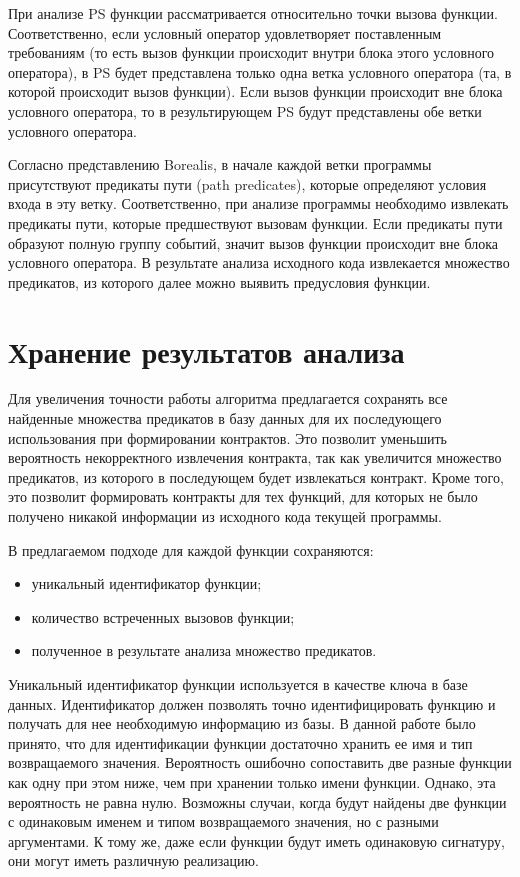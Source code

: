 При анализе PS функции рассматривается относительно точки вызова функции. Соответственно, если условный оператор удовлетворяет поставленным требованиям (то есть вызов функции происходит внутри блока этого условного оператора), в PS будет представлена только одна ветка условного оператора (та, в которой происходит вызов функции). Если вызов функции происходит вне блока условного оператора, то в результирующем PS будут представлены обе ветки условного оператора.

Согласно представлению Borealis, в начале каждой ветки программы присутствуют предикаты пути (path predicates), которые определяют условия входа в эту ветку. Соответственно, при анализе программы необходимо извлекать предикаты пути, которые предшествуют вызовам функции. Если предикаты пути образуют полную группу событий, значит вызов функции происходит вне блока условного оператора. В результате анализа исходного кода извлекается множество предикатов, из которого далее можно выявить предусловия функции.

\section{Хранение результатов анализа}
\label{section:saving}
Для увеличения точности работы алгоритма предлагается сохранять все найденные множества предикатов в базу данных для их последующего использования при формировании контрактов. Это позволит уменьшить вероятность некорректного извлечения контракта, так как увеличится множество предикатов, из которого в последующем будет извлекаться контракт. Кроме того, это позволит формировать контракты для тех функций, для которых не было получено никакой информации из исходного кода текущей программы.

В предлагаемом подходе для каждой функции сохраняются:
\begin{itemize}
\item уникальный идентификатор функции;
\item количество встреченных вызовов функции;
\item полученное в результате анализа множество предикатов.
\end{itemize}

Уникальный идентификатор функции используется в качестве ключа в базе данных. Идентификатор должен позволять точно идентифицировать функцию и получать для нее необходимую информацию из базы. В данной работе было принято, что для идентификации функции достаточно хранить ее имя и тип возвращаемого значения. Вероятность ошибочно сопоставить две разные функции как одну при этом ниже, чем при хранении только имени функции. Однако, эта вероятность не равна нулю. Возможны случаи, когда будут найдены две функции с одинаковым именем и типом возвращаемого значения, но с разными аргументами. К тому же, даже если функции будут иметь одинаковую сигнатуру, они могут иметь различную реализацию.

